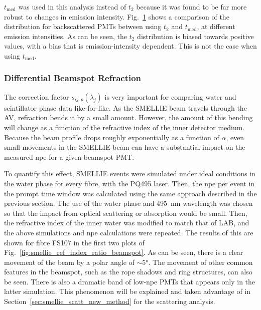 $t_{\mathrm{med}}$ was used in this analysis instead of $t_{2}$ because it was found to be far more robust to changes in emission intensity. Fig.~\ref{fig:t2_temm_comparison} shows a comparison of the \tres{} distribution for backscattered PMTs between using $t_{2}$ and $t_{\mathrm{med}}$, at different emission intensities. As can be seen, the $t_{2}$ distribution is biased towards positive \tres{} values, with a bias that is emission-intensity dependent. This is not the case when using $t_{\mathrm{med}}$. 

\begin{figure}
    \centering
    \caption[]{}
    \label{fig:t2_temm_comparison}
\end{figure}


\subsubsection{Differential Beamspot Refraction}\label{sec:smellie_ext_corrections}
The correction factor $s_{ij,p}(\lambda_{j})$ is very important for comparing water and scintillator phase data like-for-like. As the SMELLIE beam travels through the AV, refraction bends it by a small amount. However, the amount of this bending will change as a function of the refractive index of the inner detector medium. Because the beam profile drops roughly exponentially as a function of $\alpha$, even small movements in the SMELLIE beam can have a substantial impact on the measured npe for a given beamspot PMT.

To quantify this effect, SMELLIE events were simulated under ideal conditions in the water phase for every fibre, with the PQ495 laser. Then, the npe per event in the prompt time window was calculated using the same approach described in the previous section. %
The use of the water phase and \SI{495}{\nm} wavelength was chosen so that the impact from optical scattering or absorption would be small. Then, the refractive index of the inner water was modified to match that of LAB, and the above simulations and npe calculations were repeated. The results of this are shown for fibre FS107 in the first two plots of Fig.~\ref{fig:smellie_ref_index_ratio_beamspot}. As can be seen, there is a clear movement of the beam by a polar angle of $\sim\ang{5}$. %
The movement of other common features in the beamspot, such as the rope shadows and ring structures, can also be seen. There is also a dramatic band of low-npe PMTs that appears only in the latter simulation. This phenomenon will be explained and taken advantage of in Section~\ref{sec:smellie_scatt_new_method} for the scattering analysis.

